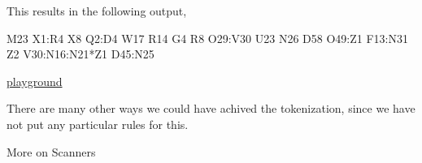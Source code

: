 This results in the following output,

\begin{go}
M23
X1:R4
X8
Q2:D4
W17
R14
G4
R8
O29:V30
U23
N26
D58
O49:Z1
F13:N31
Z2
V30:N16:N21*Z1
D45:N25
\end{go}

\href{https://play.golang.org/p/dARWJnLi6Tz}{playground}

There are many other ways we could have achived the tokenization, since we have not put any particular rules for this.

More on Scanners

